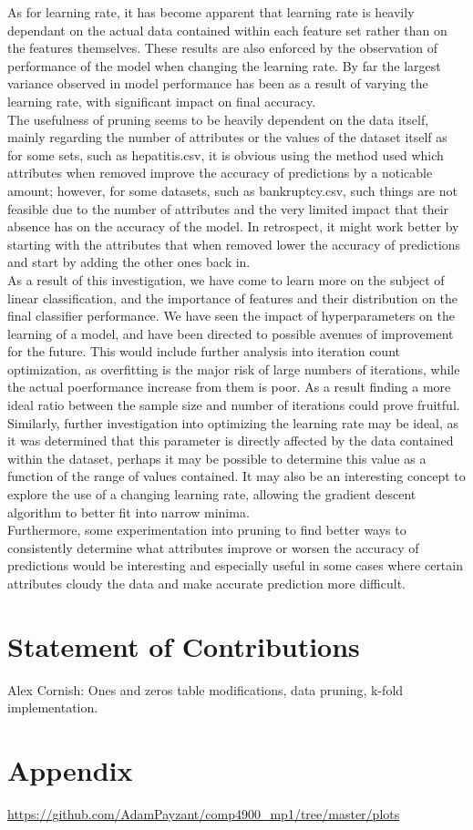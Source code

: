 As for learning rate, it has become apparent that learning rate is heavily dependant on the actual data contained within each feature set rather than on the features themselves. These results are also enforced by the observation of performance of the model when changing the learning rate. By far the largest variance observed in model performance has been as a result of varying the learning rate, with significant impact on final accuracy.\\

The usefulness of pruning seems to be heavily dependent on the data itself, mainly regarding the number of attributes or the values of the dataset itself as for some sets, such as hepatitis.csv, it is obvious using the method used which attributes when removed improve the accuracy of predictions by a noticable amount; however, for some datasets, such as bankruptcy.csv, such things are not feasible due to the number of attributes and the very limited impact that their absence has on the accuracy of the model. In retrospect, it might work better by starting with the attributes that when removed lower the accuracy of predictions and start by adding the other ones back in.\\

As a result of this investigation, we have come to learn more on the subject of linear classification, and the importance of features and their distribution on the final classifier performance. We have seen the impact of hyperparameters on the learning of a model, and have been directed to possible avenues of improvement for the future. This would include further analysis into iteration count optimization, as overfitting is the major risk of large numbers of iterations, while the actual poerformance increase from them is poor. As a result finding a more ideal ratio between the sample size and number of iterations could prove fruitful. Similarly, further investigation into optimizing the learning rate may be ideal, as it was determined that this parameter is directly affected by the data contained within the dataset, perhaps it may be possible to determine this value as a function of the range of values contained. It may also be an interesting concept to explore the use of a changing learning rate, allowing the gradient descent algorithm to better fit into narrow minima.\\

Furthermore, some experimentation into pruning to find better ways to consistently determine what attributes improve or worsen the accuracy of predictions would be interesting and especially useful in some cases where certain attributes cloudy the data and make accurate prediction more difficult.\\

\section{Statement of Contributions}

Alex Cornish: Ones and zeros table modifications, data pruning, k-fold implementation.

\section{Appendix}

\url{https://github.com/AdamPayzant/comp4900_mp1/tree/master/plots}




